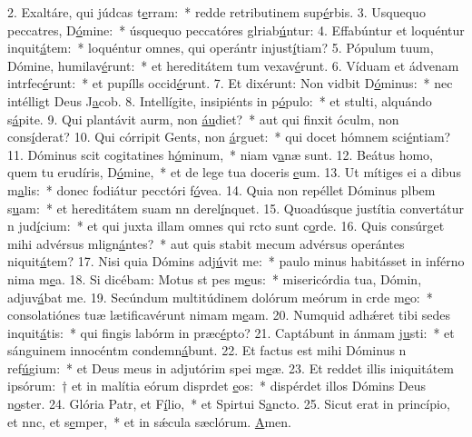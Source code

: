 2. Exaltáre, qui júdcas t\uline{e}rram:~* redde retributinem sup\uline{é}rbis.
3. Usquequo peccatres, D\uline{ó}mine:~* úsquequo peccatóres glriab\uline{ú}ntur:
4. Effabúntur et loquéntur inquit\uline{á}tem:~* loquéntur omnes, qui operántr injust\uline{í}tiam?
5. Pópulum tuum, Dómine, humilav\uline{é}runt:~* et hereditátem tum vexav\uline{é}runt.
6. Víduam et ádvenam intrfec\uline{é}runt:~* et pupílls occid\uline{é}runt.
7. Et dixérunt: Non vidbit D\uline{ó}minus:~* nec intélligt Deus J\uline{a}cob.
8. Intellígite, insipiénts in p\uline{ó}pulo:~* et stulti, alquándo s\uline{á}pite.
9. Qui plantávit aurm, non \uline{áu}diet?~* aut qui finxit óculm, non cons\uline{í}derat?
10. Qui córripit Gents, non \uline{á}rguet:~* qui docet hómnem sci\uline{é}ntiam?
11. Dóminus scit cogitatines h\uline{ó}minum,~* niam v\uline{a}næ sunt.
12. Beátus homo, quem tu erudíris, D\uline{ó}mine,~* et de lege tua doceris \uline{e}um.
13. Ut mítiges ei a dibus m\uline{a}lis:~* donec fodiátur pecctóri f\uline{ó}vea.
14. Quia non repéllet Dóminus plbem s\uline{u}am:~* et hereditátem suam nn derel\uline{í}nquet.
15. Quoadúsque justítia convertátur n jud\uline{í}cium:~* et qui juxta illam omnes qui rcto sunt c\uline{o}rde.
16. Quis consúrget mihi advérsus mlign\uline{á}ntes?~* aut quis stabit mecum advérsus operántes niquit\uline{á}tem?
17. Nisi quia Dómins adj\uline{ú}vit me:~* paulo minus habitásset in inférno nima m\uline{e}a.
18. Si dicébam: Motus st pes m\uline{e}us:~* misericórdia tua, Dómin, adjuv\uline{á}bat me.
19. Secúndum multitúdinem dolórum meórum in crde m\uline{e}o:~* consolatiónes tuæ lætificavérunt nimam m\uline{e}am.
20. Numquid adhǽret tibi sedes inquit\uline{á}tis:~* qui fingis labórm in præc\uline{é}pto?
21. Captábunt in ánmam j\uline{u}sti:~* et sánguinem innocéntm condemn\uline{á}bunt.
22. Et factus est mihi Dóminus n ref\uline{ú}gium:~* et Deus meus in adjutórim spei m\uline{e}æ.
23. Et reddet illis iniquitátem ipsórum:~† et in malítia eórum disprdet \uline{e}os:~* dispérdet illos Dómins Deus n\uline{o}ster.
24. Glória Patr, et F\uline{í}lio,~* et Spirtui S\uline{a}ncto.
25. Sicut erat in princípio, et nnc, et s\uline{e}mper,~* et in sǽcula sæclórum. \uline{A}men.
